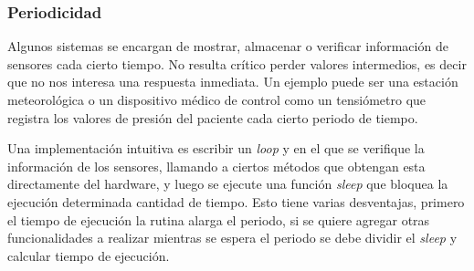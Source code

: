 \begin{figure}[H]
\begin{center}
{
}
\end{center}
\end{figure}


\subsubsection*{Periodicidad}

Algunos sistemas se encargan de mostrar, almacenar o verificar información de sensores cada cierto tiempo. No resulta crítico perder valores intermedios, es decir que no nos interesa una respuesta inmediata. Un ejemplo puede ser una estación meteorológica o un dispositivo médico de control como un tensiómetro que registra los valores de presión del paciente cada cierto periodo de tiempo.

Una implementación intuitiva es escribir un \textit{loop} y en el que se verifique la información de los sensores, llamando a ciertos métodos que obtengan esta directamente del hardware, y luego se ejecute una función \textit{sleep} que bloquea la ejecución determinada cantidad de tiempo. Esto tiene varias desventajas, primero el tiempo de ejecución la rutina alarga el periodo, si se quiere agregar otras funcionalidades a realizar mientras se espera el periodo se debe dividir el \textit{sleep} y calcular tiempo de ejecución.

